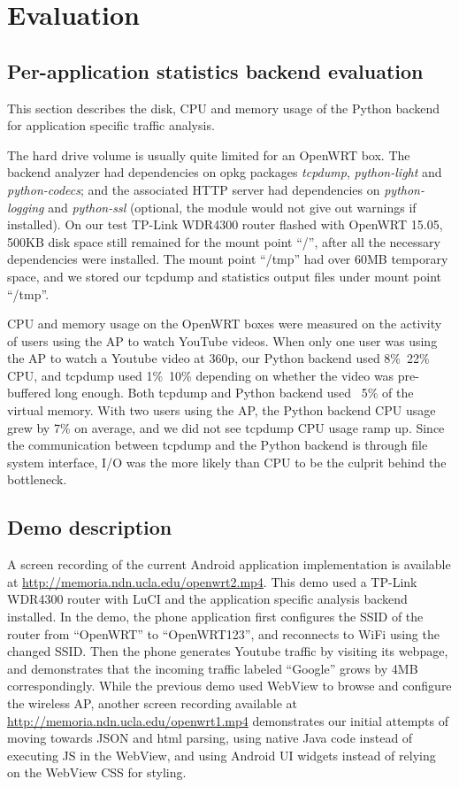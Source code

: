 \section{Evaluation}

\subsection{Per-application statistics backend evaluation}

This section describes the disk, CPU and memory usage of the Python backend for application specific traffic analysis. 

The hard drive volume is usually quite limited for an OpenWRT box. The backend analyzer had dependencies on opkg packages \textit{tcpdump}, \textit{python-light} and \textit{python-codecs}; and the associated HTTP server had dependencies on \textit{python-logging} and \textit{python-ssl} (optional, the module would not give out warnings if installed). On our test TP-Link WDR4300 router flashed with OpenWRT 15.05, 500KB disk space still remained for the mount point ``/'', after all the necessary dependencies were installed. The mount point ``/tmp'' had over 60MB temporary space, and we stored our tcpdump and statistics output files under mount point ``/tmp''.

CPU and memory usage on the OpenWRT boxes were measured on the activity of users using the AP to watch YouTube videos. When only one user was using the AP to watch a Youtube video at 360p, our Python backend used 8\%~22\% CPU, and tcpdump used 1\%~10\% depending on whether the video was pre-buffered long enough. Both tcpdump and Python backend used ~5\% of the virtual memory. With two users using the AP, the Python backend CPU usage grew by 7\% on average, and we did not see tcpdump CPU usage ramp up. Since the communication between tcpdump and the Python backend is through file system interface, I/O was the more likely than CPU to be the culprit behind the bottleneck.

\subsection{Demo description}

A screen recording of the current Android application implementation is available at \url{http://memoria.ndn.ucla.edu/openwrt2.mp4}. This demo used a TP-Link WDR4300 router with LuCI and the application specific analysis backend installed. In the demo, the phone application first configures the SSID of the router from ``OpenWRT'' to ``OpenWRT123'', and reconnects to WiFi using the changed SSID. Then the phone generates Youtube traffic by visiting its webpage, and demonstrates that the incoming traffic labeled ``Google'' grows by 4MB correspondingly. While the previous demo used WebView to browse and configure the wireless AP, another screen recording available at \url{http://memoria.ndn.ucla.edu/openwrt1.mp4} demonstrates our initial attempts of moving towards JSON and html parsing, using native Java code instead of executing JS in the WebView, and using Android UI widgets instead of relying on the WebView CSS for styling.